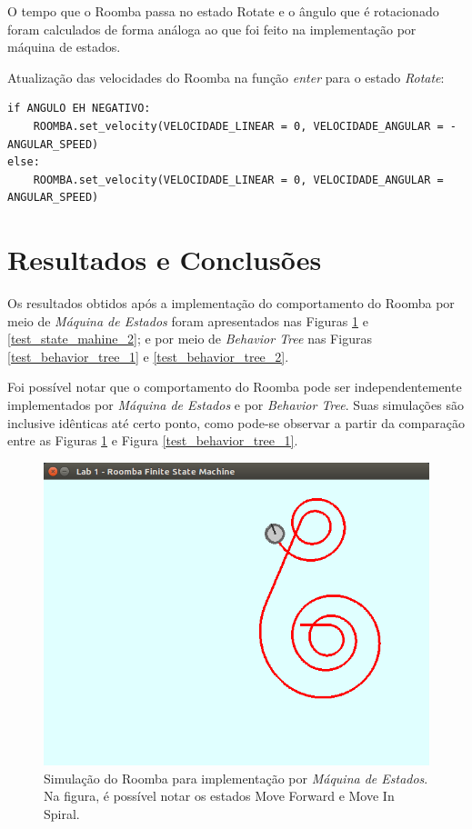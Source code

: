 \documentclass[conference]{IEEEtran}
\begin{document}
O tempo que o Roomba passa no estado Rotate e o ângulo que é rotacionado foram calculados de forma análoga ao que foi feito na implementação por máquina de estados.

Atualização das velocidades do Roomba na função \textit{enter} para o estado \textit{Rotate}:
\begin{lstlisting}
if ANGULO EH NEGATIVO:
	ROOMBA.set_velocity(VELOCIDADE_LINEAR = 0, VELOCIDADE_ANGULAR = -ANGULAR_SPEED)
else:
	ROOMBA.set_velocity(VELOCIDADE_LINEAR = 0, VELOCIDADE_ANGULAR = ANGULAR_SPEED)
\end{lstlisting}

\section{Resultados e Conclusões}
Os resultados obtidos após a implementação do comportamento do Roomba por meio de \textit{Máquina de Estados} foram apresentados nas Figuras \ref{test_state_machine_1} e \ref{test_state_mahine_2}; e por meio de \textit{Behavior Tree} nas Figuras \ref{test_behavior_tree_1} e \ref{test_behavior_tree_2}.

Foi possível notar que o comportamento do Roomba pode ser independentemente implementados por \textit{Máquina de Estados} e por \textit{Behavior Tree}. Suas simulações são inclusive idênticas até certo ponto, como pode-se observar a partir da comparação entre as Figuras \ref{test_state_machine_1} e Figura \ref{test_behavior_tree_1}.

\begin{figure}[htbp]
\centerline{\includegraphics[scale=0.4]{test_state_machine_1.png}}
\caption{Simulação do Roomba para implementação por \textit{Máquina de Estados}. Na figura, é possível notar os estados Move Forward e Move In Spiral.}
\label{test_state_machine_1}
\end{figure}
\end{document}
